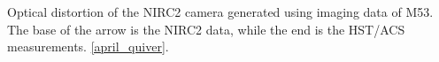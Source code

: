 Optical distortion of the NIRC2 camera generated using imaging data of M53.  The base of the arrow is the NIRC2 data, while the end is the HST/ACS measurements. \ref{april_quiver}.   